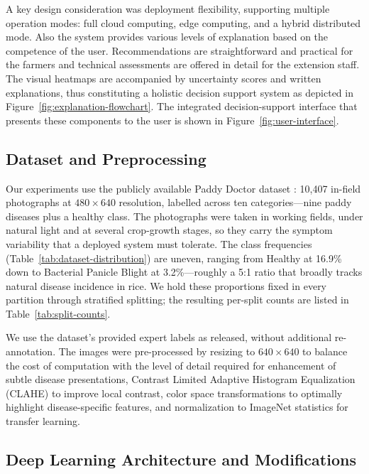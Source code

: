 \documentclass[pdflatex,sn-mathphys-num]{sn-jnl}%
\begin{document}
A key design consideration was deployment flexibility, supporting multiple operation modes: full cloud computing, edge computing, and a hybrid distributed mode. Also the system provides various levels of explanation based on the competence of the user. Recommendations are straightforward and practical for the farmers and technical assessments are offered in detail for the extension staff. The visual heatmaps are accompanied by uncertainty scores and written explanations, thus constituting a holistic decision support system as depicted in Figure~\ref{fig:explanation-flowchart}. The integrated decision-support interface that presents these components to the user is shown in Figure~\ref{fig:user-interface}.

\subsection{Dataset and Preprocessing}\label{subsec:dataset}

Our experiments use the publicly available Paddy Doctor dataset \cite{petchiammal2023paddy}: 10,407 in-field photographs at $480 \times 640$ resolution, labelled across ten categories---nine paddy diseases plus a healthy class. The photographs were taken in working fields, under natural light and at several crop-growth stages, so they carry the symptom variability that a deployed system must tolerate. The class frequencies (Table~\ref{tab:dataset-distribution}) are uneven, ranging from Healthy at 16.9\% down to Bacterial Panicle Blight at 3.2\%---roughly a 5:1 ratio that broadly tracks natural disease incidence in rice. We hold these proportions fixed in every partition through stratified splitting; the resulting per-split counts are listed in Table~\ref{tab:split-counts}.

We use the dataset's provided expert labels as released, without additional re-annotation. The images were pre-processed by resizing to $640 \times 640$ to balance the cost of computation with the level of detail required for enhancement of subtle disease presentations, Contrast Limited Adaptive Histogram Equalization (CLAHE) to improve local contrast, color space transformations to optimally highlight disease-specific features, and normalization to ImageNet statistics for transfer learning.

\subsection{Deep Learning Architecture and Modifications}\label{subsec:dl-architecture}
\end{document}

